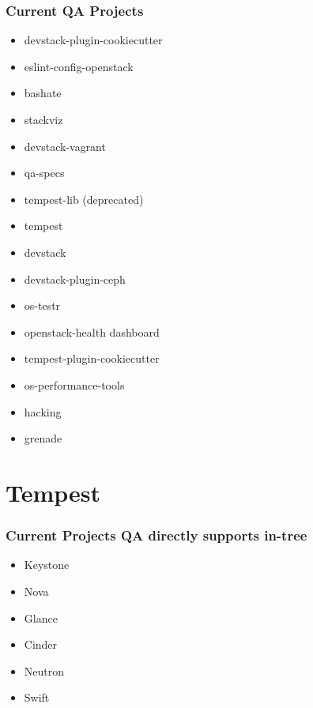 \documentclass[aspectratio=169,11pt,hyperref={colorlinks=true}]{beamer}
\begin{document}
\begin{frame}
    \frametitle{Current QA Projects}
    \begin{itemize}
        \item{devstack-plugin-cookiecutter}
        \item{eslint-config-openstack}
        \item{bashate}
        \item{stackviz}
        \item{devstack-vagrant}
        \item{qa-specs}
        \item{tempest-lib (deprecated)}
        \item{tempest}
        \item{devstack}
        \item{devstack-plugin-ceph}
        \item{os-testr}
        \item{openstack-health dashboard}
        \item{tempest-plugin-cookiecutter}
        \item{os-performance-tools}
        \item{hacking}
        \item{grenade}
    \end{itemize}
\end{frame}

\section{Tempest}
\begin{frame}
    \frametitle{Current Projects QA directly supports in-tree}
    \begin{itemize}
        \item Keystone
        \item Nova
        \item Glance
        \item Cinder
        \item Neutron
        \item Swift
    \end{itemize}
\end{frame}
\end{document}
